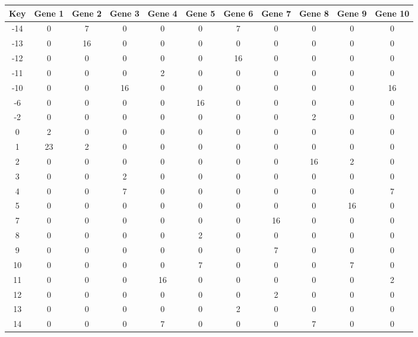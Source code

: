 \begin{tabular}{|c|c|c|c|c|c|c|c|c|c|c|}
\hline
Key & Gene 1 & Gene 2 & Gene 3 & Gene 4 & Gene 5 & Gene 6 & Gene 7 & Gene 8 & Gene 9 & Gene 10 \\
\hline
-14 & 0 & 7 & 0 & 0 & 0 & 7 & 0 & 0 & 0 & 0 \\
-13 & 0 & 16 & 0 & 0 & 0 & 0 & 0 & 0 & 0 & 0 \\
-12 & 0 & 0 & 0 & 0 & 0 & 16 & 0 & 0 & 0 & 0 \\
-11 & 0 & 0 & 0 & 2 & 0 & 0 & 0 & 0 & 0 & 0 \\
-10 & 0 & 0 & 16 & 0 & 0 & 0 & 0 & 0 & 0 & 16 \\
-6 & 0 & 0 & 0 & 0 & 16 & 0 & 0 & 0 & 0 & 0 \\
-2 & 0 & 0 & 0 & 0 & 0 & 0 & 0 & 2 & 0 & 0 \\
0 & 2 & 0 & 0 & 0 & 0 & 0 & 0 & 0 & 0 & 0 \\
1 & 23 & 2 & 0 & 0 & 0 & 0 & 0 & 0 & 0 & 0 \\
2 & 0 & 0 & 0 & 0 & 0 & 0 & 0 & 16 & 2 & 0 \\
3 & 0 & 0 & 2 & 0 & 0 & 0 & 0 & 0 & 0 & 0 \\
4 & 0 & 0 & 7 & 0 & 0 & 0 & 0 & 0 & 0 & 7 \\
5 & 0 & 0 & 0 & 0 & 0 & 0 & 0 & 0 & 16 & 0 \\
7 & 0 & 0 & 0 & 0 & 0 & 0 & 16 & 0 & 0 & 0 \\
8 & 0 & 0 & 0 & 0 & 2 & 0 & 0 & 0 & 0 & 0 \\
9 & 0 & 0 & 0 & 0 & 0 & 0 & 7 & 0 & 0 & 0 \\
10 & 0 & 0 & 0 & 0 & 7 & 0 & 0 & 0 & 7 & 0 \\
11 & 0 & 0 & 0 & 16 & 0 & 0 & 0 & 0 & 0 & 2 \\
12 & 0 & 0 & 0 & 0 & 0 & 0 & 2 & 0 & 0 & 0 \\
13 & 0 & 0 & 0 & 0 & 0 & 2 & 0 & 0 & 0 & 0 \\
14 & 0 & 0 & 0 & 7 & 0 & 0 & 0 & 7 & 0 & 0 \\
\hline
\end{tabular}
